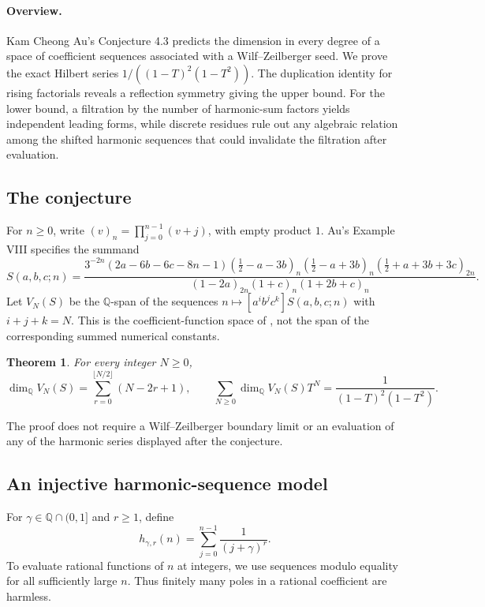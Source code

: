 \documentclass[11pt,a4paper]{article}
\newtheorem{SourceRbiHtheorem}{Theorem}
\begin{document}
\begingroup
\newcommand{\Q}{\mathbb Q}
\newcommand{\orddeg}{\operatorname{deg}}
\setcounter{equation}{0}
\renewcommand{\theequation}{\thesection.\arabic{equation}}
\renewcommand{\theHequation}{R18H.\arabic{equation}}
\paragraph{Overview.}
Kam Cheong Au's Conjecture 4.3 predicts the dimension in every degree of
a space of coefficient sequences associated with a Wilf--Zeilberger
seed. We prove the exact Hilbert series
$1/((1-T)^2(1-T^2))$. The duplication identity for rising factorials reveals
a reflection symmetry giving the upper bound. For the lower bound, a
filtration by the number of harmonic-sum factors yields independent
leading forms, while discrete residues rule out any algebraic relation
among the shifted harmonic sequences that could invalidate the
filtration after evaluation.


\subsection{The conjecture}
For $n\geq 0$, write $(v)_n=\prod_{j=0}^{n-1}(v+j)$, with empty product $1$.
Au's Example VIII \cite[Conjecture 4.3]{R18H:au} specifies the summand
\begin{equation}
S(a,b,c;n)=
\frac{3^{-2n}(2a-6b-6c-8n-1)
 (\frac12-a-3b)_n(\frac12-a+3b)_n
 (\frac12+a+3b+3c)_{2n}}
 {(1-2a)_{2n}(1+c)_n(1+2b+c)_n}.
\label{R18H:source}
\end{equation}
Let $V_N(S)$ be the $\Q$-span of the sequences
$n\mapsto[a^i b^j c^k]S(a,b,c;n)$ with $i+j+k=N$. This is the
coefficient-function space of \cite[\S2.2]{R18H:au}, not the span of the
corresponding summed numerical constants.

\begin{SourceRbiHtheorem}
For every integer $N\geq 0$,
\[
\dim_{\Q}V_N(S)=\sum_{r=0}^{\lfloor N/2\rfloor}(N-2r+1),
\qquad
\sum_{N\geq0}\dim_{\Q}V_N(S)T^N=\frac{1}{(1-T)^2(1-T^2)}.
\]
\end{SourceRbiHtheorem}

The proof does not require a Wilf--Zeilberger boundary limit or an evaluation
of any of the harmonic series displayed after the conjecture.

\subsection{An injective harmonic-sequence model}
For $\gamma\in\Q\cap(0,1]$ and $r\geq1$, define
\[
h_{\gamma,r}(n)=\sum_{j=0}^{n-1}\frac1{(j+\gamma)^r}.
\]
To evaluate rational functions of $n$ at integers, we use sequences modulo
equality for all sufficiently large $n$. Thus finitely many poles in a
rational coefficient are harmless.
\end{document}
